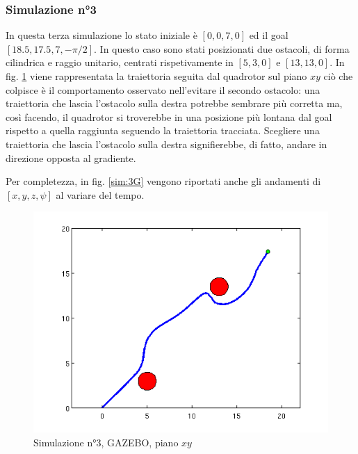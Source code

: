 \documentclass[a4paper,10pt]{article}
\begin{document}
\subsubsection*{Simulazione n°3}
In questa terza simulazione lo stato iniziale è $[0,0,7,0]$ ed il goal $[18.5, 17.5, 7, -\pi/2]$. In questo caso sono stati posizionati due ostacoli, di forma cilindrica e raggio unitario, centrati rispetivamente in $[5,3,0]$ e $[13,13,0]$. In fig. \ref{sim:3xy_G} viene rappresentata la traiettoria seguita dal quadrotor sul piano $xy$ ciò che colpisce è il comportamento osservato nell'evitare il secondo ostacolo: una traiettoria che lascia l'ostacolo sulla destra potrebbe sembrare più corretta ma, così facendo, il quadrotor si troverebbe in una posizione più lontana dal goal rispetto a quella raggiunta seguendo la traiettoria tracciata. Scegliere una traiettoria che lascia l'ostacolo sulla destra signifierebbe, di fatto, andare in direzione opposta al gradiente.

Per completezza, in fig. \ref{sim:3G} vengono riportati anche gli andamenti di $[x,y,z,\psi]$ al variare del tempo.

\begin{figure}
\begin{center}
\includegraphics[scale=0.5]{img/plot/gazebo/simulazione3_xy.png}
\end{center}
\caption{Simulazione n°3, GAZEBO, piano $xy$}
\label{sim:3xy_G}
\end{figure}
\end{document}
